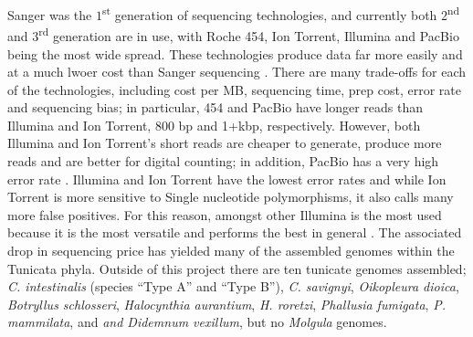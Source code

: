 Sanger was the $1$\textsuperscript{st} generation of sequencing technologies, and currently both $2$\textsuperscript{nd} and $3$\textsuperscript{rd} generation are in use, with Roche 454, Ion Torrent, Illumina and PacBio being the most wide spread. These technologies produce data far more easily and at a much lwoer cost than Sanger sequencing \cite{metzker_emerging_2005}. There are many trade-offs for each of the technologies, including cost per MB, sequencing time, prep cost, error rate and sequencing bias; in particular, 454 and PacBio have longer reads than Illumina and Ion Torrent, 800 bp and 1+kbp, respectively. However, both Illumina and Ion Torrent's short reads are cheaper to generate, produce more reads and are better for digital counting; in addition, PacBio has a very high error rate \cite{glenn_field_2011}. Illumina and Ion Torrent have the lowest error rates and while Ion Torrent is more sensitive to Single nucleotide polymorphisms, it also calls many more false positives.  For this reason, amongst other Illumina is the most used because it is the most versatile and performs the best in general \cite{quail_tale_2012}. The associated drop in sequencing price has yielded many of the assembled genomes within the Tunicata phyla. Outside of this project there are ten tunicate genomes assembled; \textit{C. intestinalis} (species ``Type A'' and ``Type B''), \textit{C. savignyi}, \textit{Oikopleura dioica}, \textit{Botryllus schlosseri}, \textit{Halocynthia aurantium}, \textit{H. roretzi}, \textit{Phallusia fumigata}, \textit{P. mammilata}, and \textit{and Didemnum vexillum}, but no \textit{Molgula} genomes.
